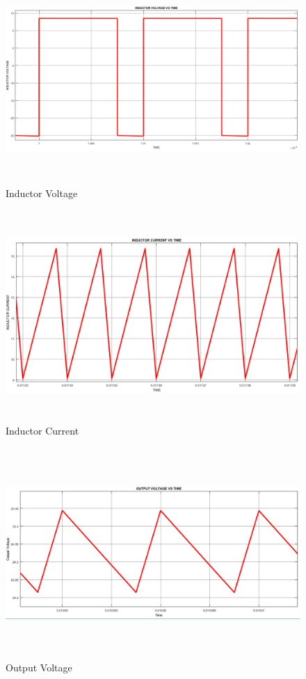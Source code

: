 \documentclass[oneside,12pt]{article}
\begin{document}
\begin{figure}[H]
	\centering
	\includegraphics[width=14cm, height=8cm]{q1/V_L}
	\caption{Inductor Voltage}
	\label{fig:vl}
\end{figure}
\begin{figure}[H]
	\centering
	\includegraphics[width=14cm, height=8cm]{q1/I_L}
	\caption{Inductor Current}
	\label{fig:il}
\end{figure}
\begin{figure}[H]
	\centering
	\includegraphics[width=14cm, height=8cm]{q1/vout}
	\caption{Output Voltage}
	\label{fig:vout}
\end{figure}
\end{document}
